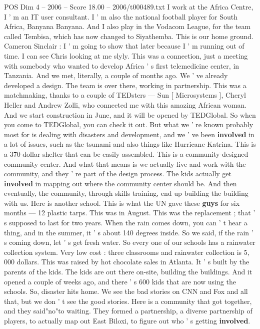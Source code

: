 \begin{textsample}{POS Dim 4 – 2006 – Score 18.00 – 2006/t000489.txt}
I work at the Africa Centre, I ' m an IT user consultant.
I ' m also the national football player for South Africa, Banyana Banyana.
And I also play in the Vodacom League, for the team called Tembisa, which has now changed to Siyathemba.
This is our home ground.
Cameron Sinclair : I ' m going to show that later because I ' m running out of time.
I can see Chris looking at me slyly.
This was a connection, just a meeting with somebody who wanted to develop Africa ' s first telemedicine center, in Tanzania.
And we met, literally, a couple of months ago.
We ' ve already developed a design.
The team is over there, working in partnership.
This was a matchmaking, thanks to a couple of TEDsters — Sun [ Microsystems ], Cheryl Heller and Andrew Zolli, who connected me with this amazing African woman.
And we start construction in June, and it will be opened by TEDGlobal.
So when you come to TEDGlobal, you can check it out.
But what we ' re known probably most for is dealing with disasters and development, and we ' ve been \textbf{involved} in a lot of issues, such as the tsunami and also things like Hurricane Katrina.
This is a 370-dollar shelter that can be easily assembled.
This is a community-designed community center.
And what that means is we actually live and work with the community, and they ' re part of the design process.
The kids actually get \textbf{involved} in mapping out where the community center should be.
And then eventually, the community, through skills training, end up building the building with us.
Here is another school.
This is what the UN gave these \textbf{guys} for six months — 12 plastic tarps.
This was in August.
This was the replacement ; that ' s supposed to last for two years.
When the rain comes down, you can ' t hear a thing, and in the summer, it ' s about 140 degrees inside.
So we said, if the rain ' s coming down, let ' s get fresh water.
So every one of our schools has a rainwater collection system.
Very low cost : three classrooms and rainwater collection is 5, 000 dollars.
This was raised by hot chocolate sales in Atlanta.
It ' s built by the parents of the kids.
The kids are out there on-site, building the buildings.
And it opened a couple of weeks ago, and there ' s 600 kids that are now using the schools.
So, disaster hits home.
We see the bad stories on CNN and Fox and all that, but we don ' t see the good stories.
Here is a community that got together, and they said"no"to waiting.
They formed a partnership, a diverse partnership of players, to actually map out East Biloxi, to figure out who ' s getting \textbf{involved}.

\end{textsample}
